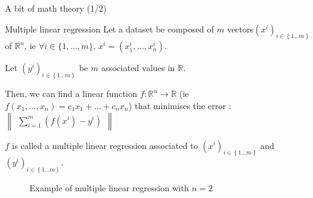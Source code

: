 \begin{frame}{A bit of math theory (1/2)}
    \begin{block}{Multiple linear regression}
        Let a dataset be composed of $m$ vectors$\ensuremath{\left(x^{i}\right)_{i\in\left\{ 1...m\right\} }}$
        of $\mathbb{R}^{n}$, ie $\forall i\in\{1,...,m\}$, $x^{i}=(x_{1}^{i},\dots,x_{n}^{i})$. 

        Let $\ensuremath{\left(y^{i}\right)_{i\in\left\{ 1...m\right\} }}$
        be $m$ associated values in $\mathbb{R}$.

        Then, we can find a linear function $f:\mathbb{R}^{n}\rightarrow\mathbb{R}$
        (ie $f(x_{1},\dots,x_{n})=c_{1}x_{1}+\dots+c_{n}x_{n}$) that minimises
        the error : $\begin{Vmatrix}\sum_{i=1}^{m}(f(x^{i})-y^{i})\end{Vmatrix}$

        $f$ is called a multiple linear regression associated to $\ensuremath{\left(x^{i}\right)_{i\in\left\{ 1...m\right\} }}$
        and $\ensuremath{\left(y^{i}\right)_{i\in\left\{ 1...m\right\} }}$.
    \end{block}
    \begin{figure}
        \caption{Example of multiple linear regression with $n=2$}
    \end{figure}
\end{frame}

